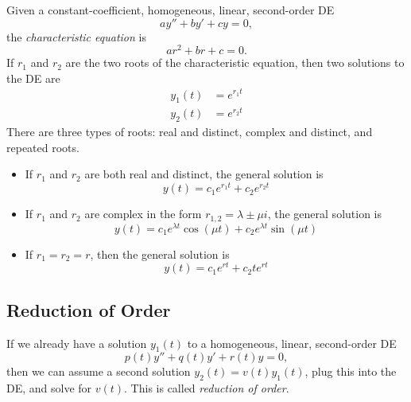 \documentclass[12pt]{article}
\theoremstyle{definition}
\begin{document}
Given a constant-coefficient, homogeneous, linear, second-order DE \begin{equation*}
	ay'' + by' + cy=0,
\end{equation*}
the \textit{characteristic equation} is \begin{equation*}
	ar^2 + br + c = 0.
\end{equation*}
If $r_1$ and $r_2$ are the two roots of the characteristic equation, then two solutions to the DE are \begin{align*}
	y_1(t) & = e^{r_1t} \\
	y_2(t) & = e^{r_2t}
\end{align*}
There are three types of roots: real and distinct, complex and distinct, and repeated roots. \begin{itemize}
	\item If $r_1$ and $r_2$ are both real and distinct, the general solution is \begin{equation*}
		      y(t) = c_1e^{r_1t} + c_2e^{r_2t}
	      \end{equation*}
	\item If $r_1$ and $r_2$ are complex in the form $r_{1,2} = \lambda \pm \mu i$, the general solution is \begin{equation*}
		      y(t) = c_1e^{\lambda t}\cos(\mu t) + c_2e^{\lambda t} \sin(\mu t)
	      \end{equation*}
	\item If $r_1=r_2=r$, then the general solution is \begin{equation*}
		      y(t) = c_1e^{rt} + c_2te^{rt}
	      \end{equation*}
\end{itemize}

\subsection{Reduction of Order}
If we already have a solution $y_1(t)$ to a homogeneous, linear, second-order DE \begin{equation*}
	p(t)y'' + q(t)y' + r(t)y = 0,
\end{equation*}
then we can assume a second solution $y_2(t) = v(t)y_1(t)$, plug this into the DE, and solve for $v(t)$.
This is called \textit{reduction of order}.
\end{document}
